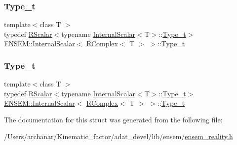 \subsubsection{\texorpdfstring{Type\_t}{Type\_t}\hspace{0.1cm}{\footnotesize\ttfamily [1/2]}}
{\footnotesize\ttfamily template$<$class T $>$ \\
typedef \mbox{\hyperlink{classENSEM_1_1RScalar}{R\+Scalar}}$<$typename \mbox{\hyperlink{structENSEM_1_1InternalScalar}{Internal\+Scalar}}$<$T$>$\+::\mbox{\hyperlink{structENSEM_1_1InternalScalar_3_01RComplex_3_01T_01_4_01_4_ae83e499664d5d34d7a1271f9151f4ab0}{Type\+\_\+t}}$>$ \mbox{\hyperlink{structENSEM_1_1InternalScalar}{E\+N\+S\+E\+M\+::\+Internal\+Scalar}}$<$ \mbox{\hyperlink{classENSEM_1_1RComplex}{R\+Complex}}$<$ T $>$ $>$\+::\mbox{\hyperlink{structENSEM_1_1InternalScalar_3_01RComplex_3_01T_01_4_01_4_ae83e499664d5d34d7a1271f9151f4ab0}{Type\+\_\+t}}}

\mbox{\label{structENSEM_1_1InternalScalar_3_01RComplex_3_01T_01_4_01_4_ae83e499664d5d34d7a1271f9151f4ab0}} 
\subsubsection{\texorpdfstring{Type\_t}{Type\_t}\hspace{0.1cm}{\footnotesize\ttfamily [2/2]}}
{\footnotesize\ttfamily template$<$class T $>$ \\
typedef \mbox{\hyperlink{classENSEM_1_1RScalar}{R\+Scalar}}$<$typename \mbox{\hyperlink{structENSEM_1_1InternalScalar}{Internal\+Scalar}}$<$T$>$\+::\mbox{\hyperlink{structENSEM_1_1InternalScalar_3_01RComplex_3_01T_01_4_01_4_ae83e499664d5d34d7a1271f9151f4ab0}{Type\+\_\+t}}$>$ \mbox{\hyperlink{structENSEM_1_1InternalScalar}{E\+N\+S\+E\+M\+::\+Internal\+Scalar}}$<$ \mbox{\hyperlink{classENSEM_1_1RComplex}{R\+Complex}}$<$ T $>$ $>$\+::\mbox{\hyperlink{structENSEM_1_1InternalScalar_3_01RComplex_3_01T_01_4_01_4_ae83e499664d5d34d7a1271f9151f4ab0}{Type\+\_\+t}}}



The documentation for this struct was generated from the following file\+:\begin{DoxyCompactItemize}
\item 
/\+Users/archanar/\+Kinematic\+\_\+factor/adat\+\_\+devel/lib/ensem/\mbox{\hyperlink{lib_2ensem_2ensem__reality_8h}{ensem\+\_\+reality.\+h}}\end{DoxyCompactItemize}
